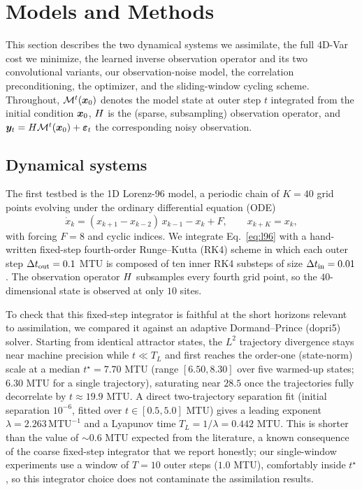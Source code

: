 \section{Models and Methods}
\label{sec:methods}

This section describes the two dynamical systems we assimilate, the full
4D-Var cost we minimize, the learned inverse
observation operator and its two convolutional variants, our observation-noise
model, the correlation preconditioning, the optimizer, and the sliding-window
cycling scheme. Throughout, $\mathcal{M}^t(\bm{x}_0)$ denotes the model state at
outer step $t$ integrated from the initial condition $\bm{x}_0$, $H$ is the
(sparse, subsampling) observation operator, and $\bm{y}_t = H\mathcal{M}^t(\bm{x}_0)
+ \boldsymbol\varepsilon_t$ the corresponding noisy observation.

\subsection{Dynamical systems}

The first testbed is the 1D Lorenz-96 model, a periodic chain of $K=40$ grid points
evolving under the ordinary differential equation (ODE)
\begin{equation}
\dot{x}_k = (x_{k+1}-x_{k-2})\,x_{k-1} - x_k + F,
\qquad x_{k+K}=x_k,
\label{eq:l96}
\end{equation}
with forcing $F=8$ and cyclic indices. We integrate
Eq.~\eqref{eq:l96} with a hand-written fixed-step fourth-order Runge--Kutta
(RK4) scheme in which each outer step $\Delta t_{\mathrm{out}} = 0.1$ MTU is
composed of ten inner RK4 substeps of size $\Delta t_{\mathrm{in}} = 0.01$. The observation operator
$H$ subsamples every fourth grid point, so the $40$-dimensional state is
observed at only $10$ sites.

To check that this fixed-step integrator is faithful at the short horizons
relevant to assimilation, we compared it against an adaptive Dormand--Prince
(dopri5) solver. Starting from identical attractor
states, the $L^2$ trajectory divergence stays near machine precision while
$t \ll T_L$ and first reaches the order-one (state-norm) scale at a median
$t^{\star}=7.70$ MTU (range $[6.50,8.30]$ over five warmed-up states; $6.30$ MTU
for a single trajectory), saturating near $28.5$ once the trajectories fully
decorrelate by $t\approx 19.9$ MTU. A direct two-trajectory separation fit
(initial separation $10^{-6}$, fitted over $t\in[0.5,5.0]$ MTU) gives a leading
exponent $\lambda = 2.263\,\mathrm{MTU}^{-1}$ and a Lyapunov time
$T_L = 1/\lambda = 0.442$ MTU. This is shorter than the value of $\sim 0.6$ MTU
expected from the literature, a known consequence of the coarse fixed-step
integrator that we report honestly; our single-window experiments use a window
of $T=10$ outer steps ($1.0$ MTU), comfortably inside $t^{\star}$, so this
integrator choice does not contaminate the assimilation results.


